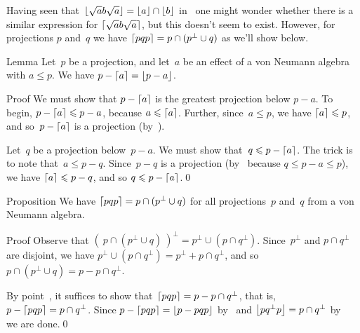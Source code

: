 \documentclass[a]{subfiles}
\begin{document}
\begin{parsec}%
\begin{point}%
Having seen that~$\left\lfloor\sqrt{a}b\sqrt{a}\right\rfloor = \left\lfloor a\right\rfloor\cap\left\lfloor b\right\rfloor$
in~
one might wonder whether
there is a similar expression for $\left\lceil\sqrt{a}b\sqrt{a}\right\rceil$,
but this doesn't seem to exist.
However,
for projections
$p$ and~$q$
we have
$\left\lceil pqp\right\rceil= p\cap (p^\perp \cup q)$
as we'll show below.
\end{point}
\begin{point}{Lemma}%
Let~$p$ be a projection,
and let~$a$ be an effect of a von Neumann algebra
with $a\leq p$.
We have $p-\left\lceil a\right\rceil=\left\lfloor p-a\right\rfloor$.
\begin{point}{Proof}%
We must show that $p-\left\lceil a\right\rceil$ is the greatest projection below $p-a$.
To begin, $p-\left\lceil a\right\rceil\leqslant p-a$,
because $a\leqslant \left\lceil a\right\rceil$.
Further, since~$a\leq p$, we have $\left\lceil a\right\rceil\leqslant p$,
and so~$p-\left\lceil a\right\rceil$ is a projection
(by~).

Let~$q$ be a projection below~$p-a$.
We must show that~$q\leqslant p-\left\lceil a\right\rceil$.
The trick is to note that~$a\leq p-q$.
Since~$p-q$ is a projection (by~
because $q\leq p-a\leq p$),
we have $\left\lceil a\right\rceil\leqslant p-q$,
and so $q\leqslant p-\left\lceil a\right\rceil$.\qed
\end{point}
\end{point}
\begin{point}{Proposition}%
We have $\left\lceil pqp\right\rceil=p\cap (p^\perp \cup q)$
for all projections~$p$ and~$q$ from a von Neumann algebra.
\begin{point}{Proof}%
Observe that $(\ p\cap (p^\perp \cup q)\ )^\perp 
= p^\perp \cup(p\cap q^\perp)$.
Since~$p^\perp$ and $p\cap q^\perp$ are disjoint,
we have $p^\perp \cup (p\cap q^\perp) = p^\perp + p\cap q^\perp$,
and so $p\cap (p^\perp \cup q) = p-p\cap q^\perp$.

By point~, 
it suffices to show that~$\left\lceil pqp\right\rceil=p- p\cap q^\perp$,
that is, $p-\left\lceil pqp\right\rceil=p\cap q^\perp$.
Since $p-\left\lceil pqp\right\rceil = \left\lfloor p-pqp\right\rfloor$
by~ and $\left\lfloor pq^\perp p\right\rfloor=p\cap q^\perp$
by~ we are done.\qed
\end{point}
\end{point}
\end{parsec}
\end{document}
